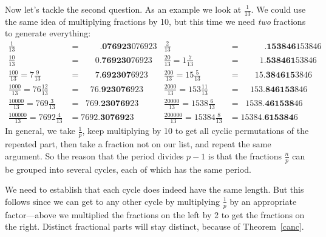 \documentclass[12pt,twoside]{article}
\theoremstyle{norm}
\newcommand{\rc}[1]{\frac{1}{#1}}
\begin{document}
Now let's tackle the second question. As an example we look at $\rc{13}$. We could use the same idea of multiplying fractions by 10, but this time we need {\it two} fractions to generate everything:
\begin{align*}
\frac{1}{13}&=\;\;\;\;\;\;\;\;.\mathbf{076923}076923&
\frac{2}{13}&=\;\;\;\;\;\;\;\;\;\;.\mathbf{153846}153846\\
\frac{10}{13}&=\;\;\;\;\;\;0.\mathbf{769230}76923&
\frac{20}{13}=1\frac{7}{13}&=\;\;\;\;\;\;\;\;1.\mathbf{538461}53846\\
\frac{100}{13}=7\frac{9}{13}&=\;\;\;\;\;\; 7.\mathbf{692307}6923&
\frac{200}{13}=15\frac{5}{13}&=\;\;\;\;\;\;15.\mathbf{384615}3846\\
\frac{1000}{13}=76\frac{12}{13}&=\;\;\;\; 76.\mathbf{923076}923&
\frac{2000}{13}=153\frac{11}{13}&=\;\;\;\;153.\mathbf{846153}846\\
\frac{10000}{13}=769\frac{3}{13}&=\;\; 769.\mathbf{230769}23&
\frac{20000}{13}=1538\frac{6}{13}&=\;\;1538.\mathbf{461538}46\\
\frac{100000}{13}=7692\frac{4}{13}&= 7692.\mathbf{307692}3&
\frac{200000}{13}=15384\frac{8}{13}&=15384.\mathbf{615384}6%
%
\end{align*}
In general, we take $\frac{1}{p}$, keep multiplying by 10 to get all cyclic permutations of the repeated part, then take a fraction not on our list, and repeat the same argument. So the reason that the period divides $p-1$ is that the fractions $\frac{n}p$ can be grouped into several cycles, each of which has the same period.

We need to establish that each cycle does indeed have the same length. But this follows since we can get to any other cycle by multiplying $\rc p$ by an appropriate factor---above we multiplied the fractions on the left by 2 to get the fractions on the right. Distinct fractional parts will stay distinct, because of Theorem~\ref{canc}.
\end{document}
